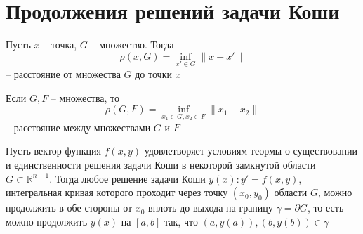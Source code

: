 \documentclass[document.tex]{subfiles}
\begin{document}
\section{Продолжения решений задачи Коши}

\begin{definition}
	Пусть $x$ -- точка, $G$ -- множество. Тогда
	$$\rho(x, G) = \inf_{x' \in G} \|x - x'\|$$
	-- расстояние от множества $G$ до точки $x$
\end{definition}

\begin{definition}
	Если $G, F$ -- множества, то
	$$\rho(G, F) = \inf_{x_1 \in G, x_2 \in F} \|x_1 - x_2\|$$
	-- расстояние между множествами $G$ и $F$
\end{definition}

\begin{theorem}
	Пусть вектор-функция $f(x, y)$ удовлетворяет условиям теормы о существовании и единственности решения задачи Коши в некоторой замкнутой области $\overline G \subset \mathbb{R}^{n+1}$. Тогда любое решение задачи Коши $y(x): y' = f(x, y)$, интегральная кривая которого проходит через точку $(x_0, y_0)$ области $G$, можно продолжить в обе стороны от $x_0$ вплоть до выхода на границу $\gamma = \partial G$, то есть можно продолжить $y(x)$ на $[a, b]$ так, что $(a, y(a)), (b, y(b)) \in \gamma$
\end{theorem}
\end{document}
